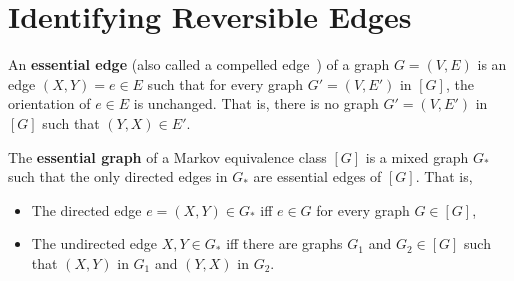 


\section{Identifying Reversible Edges}


\begin{definition} %
An \textbf{essential edge} (also called a compelled edge~\cite{chickering}) of a graph $G = (V,E)$ is an edge $(X,Y) = e \in E$ such that for every graph $G' = (V,E')$ in $[G]$, the orientation of $e \in E$ is unchanged. That is, there is no graph $G' = (V,E')$ in $[G]$ such that $(Y,X) \in E'.$
\end{definition}

\begin{definition} 
The \textbf{essential graph} of a Markov equivalence class $[G]$ is a mixed graph $G_{*}$ such that the only directed edges in $G_{*}$ are essential edges of $[G]$. That is,
\begin{itemize}
	\item The directed edge $ e = (X, Y) \in G_{*}$ iff  $e \in G$ for every graph $G \in [G]$,
	\item The undirected edge ${X,Y} \in G_{*}$ iff there are graphs $G_{1}$ and $G_{2} \in [G]$ such that $(X, Y)$ in $G_{1}$ and $(Y, X)$ in $G_{2}$. 
\end{itemize}
\end{definition}


